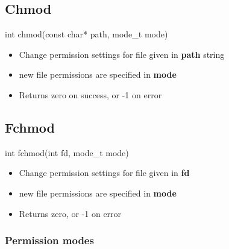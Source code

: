 \documentclass{report}
\begin{document}
        \bigbreak \noindent 
        \subsection{Chmod}
        \bigbreak \noindent 
        \begin{cppcode}
        int chmod(const char* path, mode_t mode)
        \end{cppcode}
        \begin{itemize}
            \item Change permission settings for file given in \textbf{path} string
            \item new file permissions are specified in \textbf{mode}
            \item Returns zero on success, or -1 on error
        \end{itemize}
        \bigbreak \noindent 

        \bigbreak \noindent 
        \subsection{Fchmod}
        \bigbreak \noindent 
        \begin{cppcode}
        int fchmod(int fd, mode_t mode)
        \end{cppcode}
        \begin{itemize}
            \item Change permission settings for file given in \textbf{fd}
            \item new file permissions are specified in \textbf{mode}
            \item Returns zero, or -1 on error
        \end{itemize}
        \bigbreak \noindent 
        \bigbreak \noindent 
        \subsubsection{Permission modes}
        \bigbreak \noindent 

    





    
    

    
\end{document}
